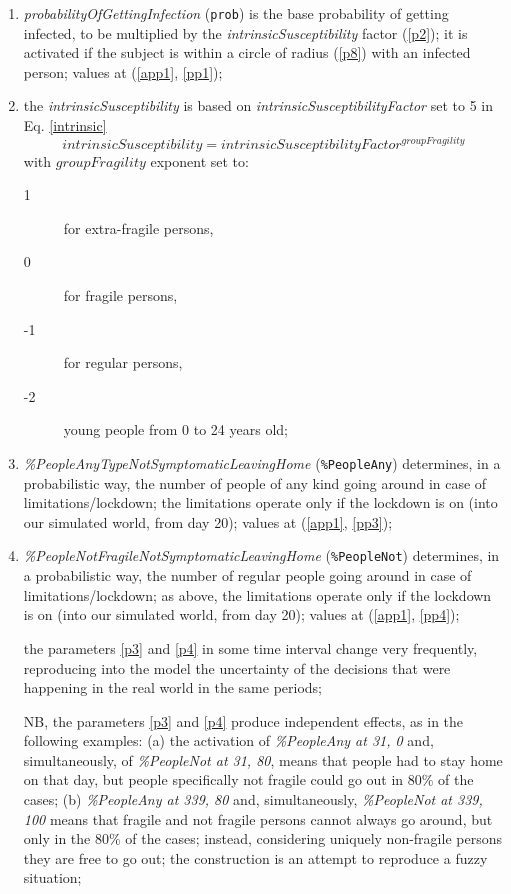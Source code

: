 \documentclass[graybox]{svmult}
\begin{document}
\begin{enumerate}[label=\roman*]

\item \label{p1} \emph{probabilityOfGettingInfection} (\verb|prob|) is the base probability of getting infected, to be multiplied by the \emph{intrinsicSusceptibility} factor (\ref{p2}); it is activated if the subject is within a circle of radius (\ref{p8}) with an infected person; values at (\ref{app1}, \ref{pp1});

\item \label{p2} the \emph{intrinsicSusceptibility} is based on \emph{intrinsicSusceptibilityFactor} set to 5 in Eq. \ref{intrinsic}
\begin{equation}
intrinsicSusceptibility = intrinsicSusceptibilityFactor^{groupFragility}
\label{intrinsic}
\end{equation}
with $groupFragility$ exponent set to:

\begin{description}
\item [1] for extra-fragile persons,
\item [0] for fragile persons,
\item [-1] for regular persons,
\item [-2] young people from 0 to 24 years old;
\end{description}

\item \label{p3} \emph{\%PeopleAnyTypeNotSymptomaticLeavingHome} (\verb|%PeopleAny|)
determines, in a probabilistic way, the number of people of any kind going around in case of limitations/lockdown; the limitations operate only if the lockdown is on (into our simulated world, from day 20); values at (\ref{app1}, \ref{pp3}); 

\item \label{p4} \emph{\%PeopleNotFragileNotSymptomaticLeavingHome} (\verb|%PeopleNot|)
determines, in a probabilistic way, the number of regular people going around in case of limitations/lockdown;
as above, the limitations operate only if the lockdown is on (into our simulated world, from day 20); values at (\ref{app1}, \ref{pp4});

the parameters \ref{p3} and \ref{p4} in some time interval change very frequently, reproducing into the model the uncertainty of the decisions that were happening in the real world in the same periods; 

NB, the parameters \ref{p3} and \ref{p4} produce independent effects, as in the following examples: (a) the activation of \emph{\%PeopleAny at 31, 0} and, simultaneously, of \emph{\%PeopleNot at 31, 80}, means that people had to stay home on that day, but people specifically not fragile could go out in 80\% of the cases; (b) \emph{\%PeopleAny at 339, 80} and, simultaneously, \emph{\%PeopleNot at 339, 100} means that fragile and not fragile persons cannot always go around, but only in the 80\% of the cases; instead, considering uniquely non-fragile persons they are free to go out; the construction is an attempt to reproduce a fuzzy situation;


\end{enumerate}
\end{document}
